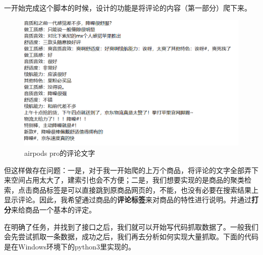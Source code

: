 一开始完成这个脚本的时候，设计的功能是将评论的内容（第一部分）爬下来。
\begin{figure}[htbp]
\centering
\includegraphics[width=13.5cm]{TIM图片20200111161800.png}
\caption{airpods pro的评论文字} %
\end{figure}
但这样做存在问题：一是，对于我一开始爬的上万个商品，将评论的文字全部弄下来空间占用太大了，建索引也会不方便；二是，我们想要实现的是商品的聚类检索，点击商品标签是可以直接跳到原商品网页的，不能，也没有必要在搜索结果上显示评论。因此，我希望通过商品的\textbf{评论标签}来对商品的特性进行说明。并通过\textbf{打分}来给商品一个基本的评定。

在明确了任务，并找到了接口之后，我们就可以开始写代码抓取数据了。一般我们会先尝试抓取一条数据，成功之后，我们再去分析如何实现大量抓取。下面的代码是在Windows环境下的python3里实现的。

